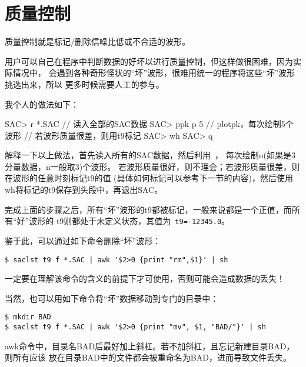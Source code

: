 \section{质量控制}

质量控制就是标记/删除信噪比低或不合适的波形。

用户可以自己在程序中判断数据的好坏以进行质量控制，但这样做很困难，因为实际情况中，
会遇到各种奇形怪状的``坏''波形，很难用统一的程序将这些``坏''波形挑选出来，所以
更多时候需要人工的参与。


我个人的做法如下：
\begin{SACCode}
SAC> r *.SAC        // 读入全部的SAC数据
SAC> ppk p 5        // plotpk，每次绘制5个波形
// 若波形质量很差，则用t9标记
SAC> wh
SAC> q
\end{SACCode}

解释一下以上做法，首先读入所有的SAC数据，然后利用~，
每次绘制n(如果是3分量数据，n一般取3)个波形。
若波形质量很好，则不理会；若波形质量很差，则在波形的任意时刻标记t9的值
(具体如何标记可以参考下一节的内容)，然后使用wh将标记的t9保存到头段中，再退出SAC。

完成上面的步骤之后，所有``坏''波形的t9都被标记，一般来说都是一个正值，而所有``好''波形的
t9则都处于未定义状态，其值为~\verb+t9=-12345.0+。

鉴于此，可以通过如下命令删除``坏''波形：
\begin{verbatim}
$ saclst t9 f *.SAC | awk '$2>0 {print "rm",$1}' | sh
\end{verbatim}
\begin{note}
一定要在理解该命令的含义的前提下才可使用，否则可能会造成数据的丢失！
\end{note}

当然，也可以用如下命令将``坏''数据移动到专门的目录中：
\begin{verbatim}
$ mkdir BAD
$ saclst t9 f *.SAC | awk '$2>0 {print "mv", $1, "BAD/"}' | sh
\end{verbatim}
\begin{note}
awk命令中，目录名BAD后最好加上斜杠。若不加斜杠，且忘记新建目录BAD，则所有应该
放在目录BAD中的文件都会被重命名为BAD，进而导致文件丢失。
\end{note}
